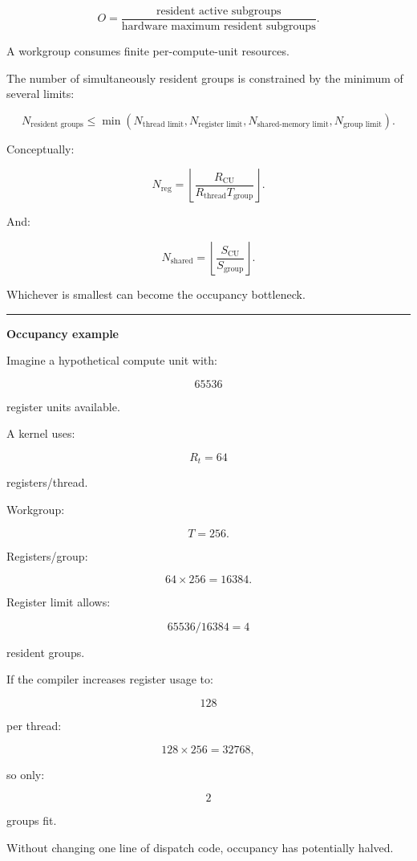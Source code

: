 \[
\boxed{
O=
\frac{
\text{resident active subgroups}
}{
\text{hardware maximum resident subgroups}
}.
}
\]

A workgroup consumes finite per-compute-unit resources.

The number of simultaneously resident groups is constrained by the minimum of several limits:

\[
N_{\text{resident groups}}
\le
\min
\left(
N_{\text{thread limit}},
N_{\text{register limit}},
N_{\text{shared-memory limit}},
N_{\text{group limit}}
\right).
\]

Conceptually:

\[
N_{\text{reg}}
=
\left\lfloor
\frac{
R_{\text{CU}}
}{
R_{\text{thread}}
T_{\text{group}}
}
\right\rfloor.
\]

And:

\[
N_{\text{shared}}
=
\left\lfloor
\frac{
S_{\text{CU}}
}{
S_{\text{group}}
}
\right\rfloor.
\]

Whichever is smallest can become the occupancy bottleneck.

\begin{center}\rule{0.5\linewidth}{0.5pt}\end{center}

\textbf{Occupancy example}

Imagine a hypothetical compute unit with:

\[
65536
\]

register units available.

A kernel uses:

\[
R_t=64
\]

registers/thread.

Workgroup:

\[
T=256.
\]

Registers/group:

\[
64\times256=16384.
\]

Register limit allows:

\[
65536/16384=4
\]

resident groups.

If the compiler increases register usage to:

\[
128
\]

per thread:

\[
128\times256=32768,
\]

so only:

\[
2
\]

groups fit.

Without changing one line of dispatch code, occupancy has potentially halved.

